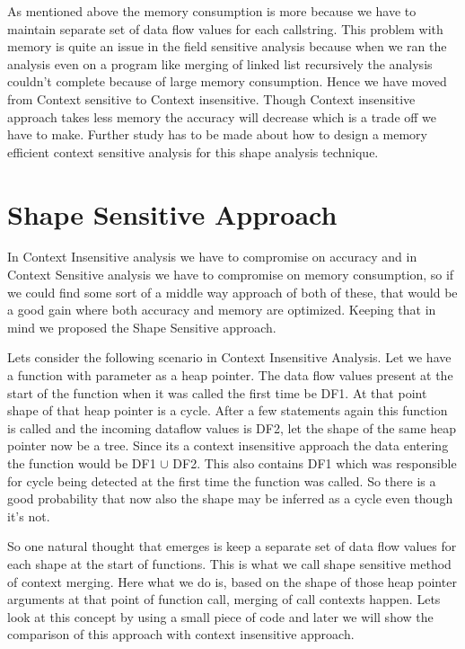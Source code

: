 As mentioned above the memory consumption is more  because we have to maintain separate set of data flow values for each callstring.
This problem with memory is quite an issue in the field sensitive analysis because when we ran the analysis even on a program like merging of linked list 
recursively \cite{linkedlist} the analysis couldn't complete because of large memory consumption. Hence we have moved from Context sensitive to 
Context insensitive.
Though Context insensitive approach takes less memory the accuracy will decrease which is a trade off we have to make.
Further study has to be made about how to design a memory efficient context sensitive analysis for this shape analysis technique.

\section{Shape Sensitive Approach}
In Context Insensitive  analysis we have to compromise on accuracy and in Context Sensitive analysis we have to compromise on memory consumption, so 
if we could find some sort of a middle way approach of both of these, that would be a good gain where both accuracy and memory are optimized. Keeping that in mind we proposed the Shape Sensitive approach.

Lets consider the following scenario in Context Insensitive Analysis. Let we have a function with parameter as a heap pointer. The 
data flow values present at the start of the function when it was called the first time be DF1. At that point shape of that heap 
pointer is a cycle. After a few statements again this function is called and the incoming dataflow values is DF2, let the shape of the same heap pointer now be a tree. Since its a context insensitive 
approach the data entering the function would be DF1 $\cup$ DF2. This also contains DF1 which was responsible for cycle being detected at the first 
time the function was called. So there is a good probability that now also the shape may be inferred as a cycle even though it's not.

So one natural thought that emerges is keep a separate set of data flow values for each shape at the start of functions. This is what we call 
shape sensitive method of context merging. Here what we do is, based on the shape of those heap pointer arguments at that point of function 
call, merging of call contexts happen.
Lets look at this concept by using a small piece of code and later we will show the comparison of this approach with context insensitive approach.

